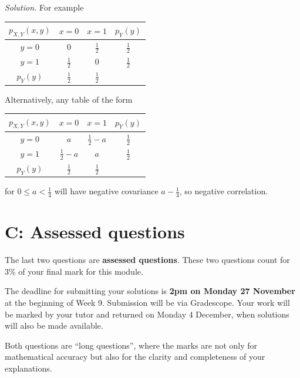 \documentclass[
  a4paper,
]{book}
\theoremstyle{definition}
\theoremstyle{definition}
\theoremstyle{definition}
\theoremstyle{definition}
\theoremstyle{remark}
\begin{document}
\begin{myanswers}
\emph{Solution.} For example

\begin{longtable}[]{@{}cccc@{}}
\toprule\noalign{}
\(p_{X,Y}(x,y)\) & \(x = 0\) & \(x = 1\) & \(p_Y(y)\) \\
\midrule\noalign{}
\endhead
\bottomrule\noalign{}
\endlastfoot
\(y = 0\) & \(0\) & \(\frac12\) & \(\frac12\) \\
\(y = 1\) & \(\frac12\) & \(0\) & \(\frac12\) \\
\(p_Y(y)\) & \(\frac12\) & \(\frac12\) & \\
\end{longtable}

Alternatively, any table of the form

\begin{longtable}[]{@{}cccc@{}}
\toprule\noalign{}
\(p_{X,Y}(x,y)\) & \(x = 0\) & \(x = 1\) & \(p_Y(y)\) \\
\midrule\noalign{}
\endhead
\bottomrule\noalign{}
\endlastfoot
\(y = 0\) & \(a\) & \(\frac12 - a\) & \(\frac12\) \\
\(y = 1\) & \(\frac12 - a\) & \(a\) & \(\frac12\) \\
\(p_Y(y)\) & \(\frac12\) & \(\frac12\) & \\
\end{longtable}

for \(0 \leq a < \frac14\) will have negative covariance \(a - \frac14\), so negative correlation.

\end{myanswers}

\hypertarget{P4-assessed}{%
\section*{C: Assessed questions}\label{P4-assessed}}

The last two questions are \textbf{assessed questions}. These two questions count for 3\% of your final mark for this module.

The deadline for submitting your solutions is \textbf{2pm on Monday 27 November} at the beginning of Week 9. Submission will be via Gradescope.
Your work will be marked by your tutor and returned on Monday 4 December, when solutions will also be made available.

Both questions are ``long questions'', where the marks are not only for mathematical accuracy but also for the clarity and completeness of your explanations.
\end{document}
